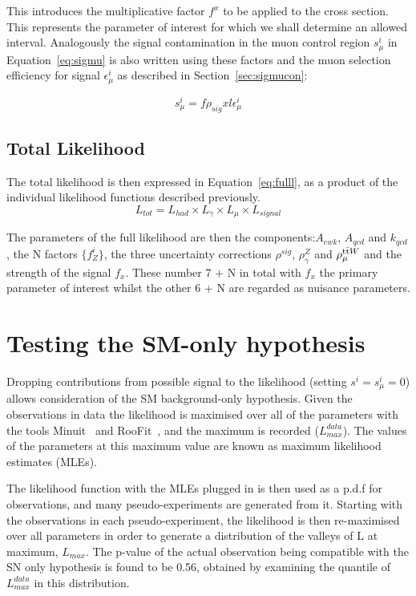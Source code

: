 This introduces the multiplicative factor $f^{x}$ to be applied to the cross section. This represents the parameter of interest for which we shall determine an allowed interval. Analogously the signal contamination in the muon control region  $s^{i}_{\mu}$ in Equation~\ref{eq:sigmu} is also written using these factors and the muon selection efficiency for signal $\epsilon^{i}_{\mu}$ as described in Section~\ref{sec:sigmucon}:

\begin{equation}
s^{i}_{\mu} = f \rho_{sig} x l \epsilon^{i}_{\mu}
\label{eq:sigmu}
\end{equation}

\subsection{Total Likelihood}

The total likelihood is then expressed in Equation~\ref{eq:fulll}, as a product of the individual likelihood functions described previously.
\begin{equation}
L_{tot} = L_{had} \times L_{\gamma} \times L_{\mu} \times L_{signal}
\label{eq:fulll}
\end{equation}

The parameters of the full likelihood are then the \RaT components:$A_{ewk}$, $A_{qcd}$ and $k_{qcd}$, the N factors $\{f^{i}_{Z}\}$, the three uncertainty corrections $\rho^{sig}$, $\rho^{Z}_{\gamma}$ and $\rho^{\textrm{t}\bar{\textrm{t}} W}_{\mu}$ and the strength of the signal $f_{x}$. These number 7 + N in total with $f _{x}$ the primary parameter of interest whilst the other 6 + N are regarded as nuisance parameters.

\section{Testing the SM-only hypothesis}

Dropping contributions from possible signal to the likelihood (setting $s^{i} = s^{i}_{\mu} = 0$) allows consideration of the SM background-only hypothesis. Given the observations in data the likelihood is maximised over all of the parameters with the tools Minuit~\cite{minuit} and RooFit~\cite{roofit}, and the maximum is recorded ($L^{data}_{max}$). The values of the parameters at this maximum value are known as maximum likelihood estimates (MLEs). 

The likelihood function with the MLEs plugged in is then used as a p.d.f for observations, and many pseudo-experiments are generated from it. Starting with the observations in each pseudo-experiment, the likelihood is then re-maximised over all parameters in order to generate a distribution of the valleys of L at maximum, $L_{max}$. The p-value of the actual observation being compatible with the SN only hypothesis is found to be 0.56, obtained by examining the quantile of $L^{data}_{max}$ in this distribution. 

